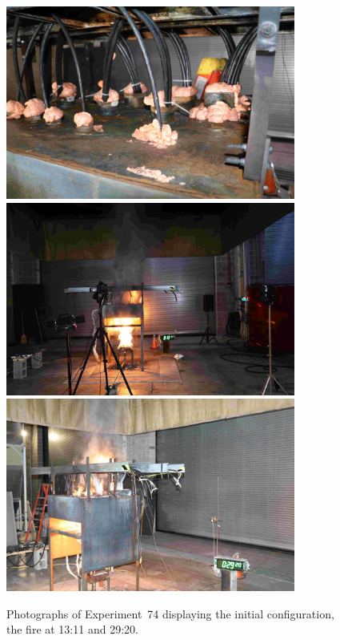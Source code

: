 \begin{figure}[p]
\centering
\includegraphics[height=2.50in]{../FIGURES/Test_74_Photo_1} \\ \vspace{0.1in}
\includegraphics[height=2.50in]{../FIGURES/Test_74_Photo_2} \\ \vspace{0.1in}
\includegraphics[height=2.50in]{../FIGURES/Test_74_Photo_3}
\caption[Photographs of Experiment~74]{Photographs of Experiment~74 displaying the initial configuration, the fire at 13:11 and 29:20.}
\label{fig:Test_74_photos}
\end{figure}


\clearpage

